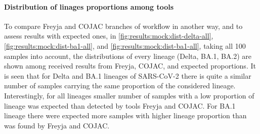         \paragraph{Distribution of linages proportions among tools}
        To compare Freyja and COJAC branches of workflow in another way, and to assess results with expected ones, in \cref{fig:results:mock:dist-delta-all}, \ref{fig:results:mock:dist-ba1-all}, and \ref{fig:results:mock:dist-ba1-all}, taking all 100 samples into account, the distributions of every lineage (Delta, BA.1, BA.2) are shown among received results from Freyja, COJAC, and expected proportions. It is seen that for Delta and BA.1 lineages of SARS-CoV-2 there is quite a similar number of samples carrying the same proportion of the considered lineage. Interestingly, for all lineages smaller number of samples with a low proportion of lineage was expected than detected by tools Freyja and COJAC. For BA.1 lineage there were expected more samples with higher lineage proportion than was found by Freyja and COJAC. 
